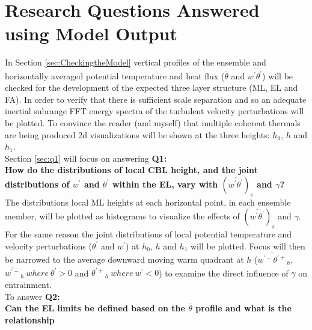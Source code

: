 
\chapter{Research Questions Answered using Model Output}
\label{ch:results}
\setlength{\parindent}{0cm}

In Section \ref{sec:CheckingtheModel} vertical profiles of the ensemble and horizontally averaged potential
temperature and heat flux ($\overline{\theta}$ and $\overline{w^{'}\theta^{'}}$) will be checked for the development
 of the expected three layer structure (\acs{ML}, \acs{EL} and \acs{FA}).  In order to verify that there is sufficient
scale separation and so an adequate inertial subrange \acs{FFT} energy spectra of the turbulent velocity perturbations 
will be plotted. To convince the reader (and myself) that multiple coherent thermals are being produced 2d visualizations
will be shown at the three heights: $h_{0}$, $h$ and $h_{1}$.\\

Section \ref{sec:q1} will focus on answering \textbf{Q1:} \\ 

\textbf{How do the distributions of local \acs{CBL} height, and the joint distributions of $w^{'}$ and $\theta^{'}$ within the \acs{EL}, vary with $(\overline{w^{'}\theta^{'}})_{s}$ and $\gamma$?}\\

The distributions local \acs{ML} heights at each horizontal point, in each ensemble member, will be plotted as histograms to visualize the effects of $(\overline{w^{'}\theta^{'}})_{s}$ and $\gamma$.  For the same reason the joint distributions of local potential temperature and velocity perturbations ($\theta^{'}$ and $w^{'}$) at $h_{0}$, $h$ and $h_{1}$ will be plotted.  Focus will then be narrowed to the average downward moving warm quadrant at $h$ ($\overline{w^{'-}\theta^{'+}}_{h}$, $\overline{w^{'-}}_{h} \ where \ \theta^{'} >0$ and $\overline{\theta^{'+}}_{h} \ where \ w^{'} < 0 $) to examine the direct influence of $\gamma$ on entrainment.\\       

To answer \textbf{Q2:}\\ 

\textbf{Can the \acs{EL} limits be defined based on the $\overline{\theta}$ profile and what is the relationship} 

